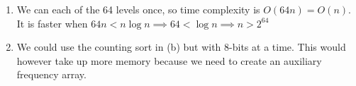\documentclass[12pt, a4paper]{article}
\begin{document}
\begin{enumerate}[Q\arabic*.]
\begin{enumerate}[(\alph*.)]
      \item We can each of the 64 levels once, so time complexity is $O(64n) = O(n)$. It is faster when $64n < n\log n \implies 64 < \log n \implies n > 2^{64}$

      \item We could use the counting sort in (b) but with 8-bits at a time. This would however take up more memory because we need to create an auxiliary frequency array. 
    \end{enumerate}
\end{enumerate}
\end{document}
